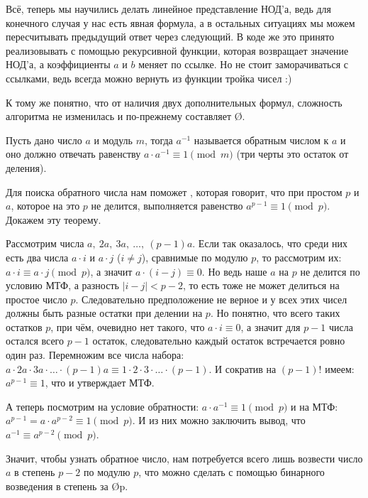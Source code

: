 Всё, теперь мы научились делать линейное представление НОД'а, ведь для конечного случая у нас есть явная формула, а в остальных ситуациях мы можем пересчитывать предыдущий ответ через следующий. В коде же это принято реализовывать с помощью рекурсивной функции, которая возвращает значение НОД'а, а коэффициенты $a$ и $b$ меняет по ссылке. Но не стоит заморачиваться с ссылками, ведь всегда можно вернуть из функции тройка чисел :)

К тому же понятно, что от наличия двух дополнительных формул, сложность алгоритма не изменилась и по-прежнему составляет \O{\log{}}.


Пусть дано число $a$ и модуль $m$, тогда $a^{-1}$ называется обратным числом к $a$ и оно должно отвечать равенству $a \cdot a^{-1} \equiv 1{\pmod {m}}$ (три черты это остаток от деления).

Для поиска обратного числа нам поможет , которая говорит, что при простом $p$ и $a$, которое на это $p$ не делится, выполняется равенство $a^{p - 1} \equiv 1{\pmod{p}}$. Докажем эту теорему.

Рассмотрим числа $a,\ 2a,\ 3a,\ \ldots,\ (p - 1)a$. Если так оказалось, что среди них есть два числа $a \cdot i$ и $a \cdot j$ ($i \ne j$), сравнимые по модулю $p$, то рассмотрим их: $a \cdot i \equiv a \cdot j {\pmod{p}}$, а значит $a \cdot (i - j) \equiv 0$. Но ведь наше $a$ на $p$ не делится по условию МТФ, а разность $|i - j| < p - 2$, то есть тоже не может делиться на простое число $p$. Следовательно предположение не верное и у всех этих чисел должны быть разные остатки при делении на $p$. Но понятно, что всего таких остатков $p$, при чём, очевидно нет такого, что $a \cdot i \equiv 0$, а значит для $p - 1$ числа остался всего $p - 1$ остаток, следовательно каждый остаток встречается ровно один раз. Перемножим все числа набора: $a \cdot 2a \cdot 3a \cdot \ldots \cdot (p - 1)a \equiv 1 \cdot 2 \cdot 3 \cdot \ldots \cdot (p - 1)$. И сократив на $(p - 1)!$ имеем: $a^{p - 1} \equiv 1$, что и утверждает МТФ.

А теперь посмотрим на условие обратности: $a \cdot a^{-1} \equiv 1 {\pmod{p}}$ и на МТФ: $a^{p - 1} = a \cdot a^{p - 2} \equiv 1 {\pmod{p}}$. И из них можно заключить вывод, что $a^{-1} \equiv a^{p - 2} {\pmod{p}}$.

Значит, чтобы узнать обратное число, нам потребуется всего лишь возвести число $a$ в степень $p - 2$ по модулю $p$, что можно сделать с помощью бинарного возведения в степень за \O{\log p}.
